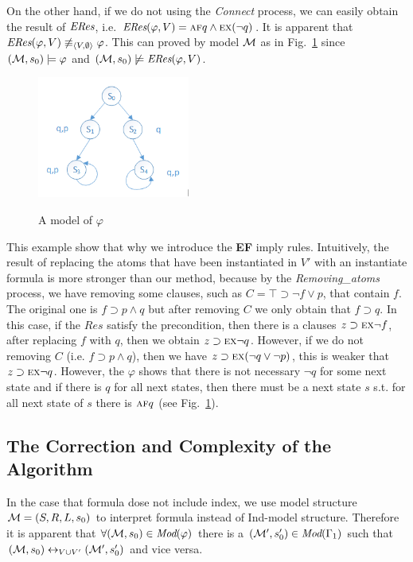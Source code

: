 \documentclass[runningheads]{llncs}
\newcommand{\tuple}[1]{{\langle{#1}\rangle}}
\newcommand{\Mod}{\textit{Mod}}
\newcommand{\lrto}{\leftrightarrow}
\newcommand{\Hm} {{\cal M}}
\newcommand{\Ind}{\textrm{Ind}}
\newcommand{\ALL}{\textsc{a}}
\newcommand{\EXIST}{\textsc{e}}
\newcommand{\NEXT}{\textsc{x}}
\newcommand{\FUTURE}{\textsc{f}}
\begin{document}
\begin{example}
On the other hand, if we do not using the \emph{Connect} process, we can easily obtain the result of $\emph{ERes}$, i.e. $\emph{ERes}(\varphi, V) = \ALL\FUTURE q \wedge  \EXIST \NEXT(\neg q)$. 
It is apparent that $\emph{ERes}(\varphi, V) \not\equiv_{\tuple{V, \emptyset}} \varphi$. This can proved by model $\Hm$ as in Fig.~\ref{Fig:models} since $(\Hm, s_0) \models \varphi$ and $(\Hm, s_0) \not \models \emph{ERes}(\varphi, V)$.
\begin{figure} 
  \centering
  \includegraphics[width=5cm]{models.png}\\
  \caption{A model of $\varphi$}\label{Fig:models}
\end{figure}
\end{example}

This example show that why we introduce the \textbf{EF} imply rules. Intuitively, the result of replacing the atoms that have been instantiated in $V'$ with an instantiate formula is more stronger than our method, because by the \emph{Removing\_atoms} process, we have removing some clauses, such as $C= \top \supset \neg f \vee p$, that contain $f$. The original one is $f \supset p \wedge q$ but after removing $C$ we only obtain that $f \supset q$. In this case, if the $Res$ satisfy the precondition, then there is a clauses $z \supset \EXIST \NEXT \neg f$, after replacing $f$ with $q$, then we obtain $z \supset \EXIST \NEXT \neg q$. However, if we do not removing $C$ (i.e. $f \supset p \wedge q$), then we have $z \supset \EXIST \NEXT (\neg q \vee \neg p)$, this is weaker that $z \supset \EXIST \NEXT \neg q$.
However, the $\varphi$ shows that there is not necessary $\neg q$ for some next state and if there is $q$ for all next states, then there must be a next state $s$ s.t. for all next state of $s$ there is $\ALL\FUTURE q$ (see Fig.~\ref{Fig:models}).



\subsection{The Correction and Complexity of the Algorithm}
In the case that formula dose not include index, we use model structure $\Hm=(S,R,L, s_0)$ to interpret formula instead of \Ind-model structure. Therefore it is apparent that $\forall (\Hm,s_0) \in \Mod(\varphi)$ there is a $(\Hm',s_0') \in \Mod(\Gamma_1)$ such that $(\Hm,s_0) \lrto_{V \cup V'} (\Hm',s_0')$ and vice versa.
\end{document}
